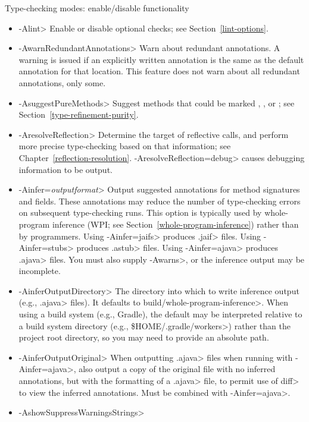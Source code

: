 Type-checking modes:  enable/disable functionality
\begin{itemize}
\item \<-Alint>
  Enable or disable optional checks; see Section~\ref{lint-options}.
\item \<-AwarnRedundantAnnotations>
  Warn about redundant annotations.
  A warning is issued if an explicitly written annotation
  is the same as the default annotation for that location.
  This feature does not warn about all redundant annotations, only some.
\item \<-AsuggestPureMethods>
  Suggest methods that could be marked
  ,
  ,
  or ; see
  Section~\ref{type-refinement-purity}.
\item \<-AresolveReflection>
  Determine the target of reflective calls, and perform more precise
  type-checking based on that information; see
  Chapter~\ref{reflection-resolution}.  \<-AresolveReflection=debug> causes
  debugging information to be output.
\item \<-Ainfer=\emph{outputformat}>
  Output suggested annotations for method signatures and fields.
  These annotations may reduce the number of type-checking
  errors on subsequent type-checking runs.  This option is
  typically used by whole-program inference (WPI; see
  Section~\ref{whole-program-inference}) rather than by programmers.
  Using \<-Ainfer=jaifs> produces \<.jaif> files.
  Using \<-Ainfer=stubs> produces \<.astub> files.
  Using \<-Ainfer=ajava> produces \<.ajava> files.
  You must also supply \<-Awarns>, or the inference output may be incomplete.
\item \<-AinferOutputDirectory>
  The directory into which to write inference output (e.g., \<.ajava>
  files).  It defaults to \<build/whole-program-inference>.  When using
  a build system (e.g., Gradle), the default may be interpreted relative to
  a build system directory (e.g., \<\$HOME/.gradle/workers>) rather than the
  project root directory, so you may need to provide an absolute path.
\item \<-AinferOutputOriginal>
  When outputting \<.ajava> files when running with \<-Ainfer=ajava>,
  also output a copy of the original file with no inferred annotations,
  but with the formatting of a \<.ajava> file, to permit use of \<diff>
  to view the inferred annotations. Must be combined with \<-Ainfer=ajava>.
\item \<-AshowSuppressWarningsStrings>

\end{itemize}
